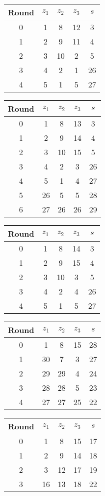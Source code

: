 \begin{multicols}{2}
\begin{tabular}{c | c | c | c | c }
Round & $z_1$ & $z_2$ & $z_3$ & $s$ \\
\hline
0 & 1 & 8 & 12 & 3 \\
1 & 2 & 9 & 11 & 4 \\
2 & 3 & 10 & 2 & 5 \\
3 & 4 & 2 & 1 & 26 \\
4 & 5 & 1 & 5 & 27
\end{tabular}


\begin{tabular}{c | c | c | c | c }
Round & $z_1$ & $z_2$ & $z_3$ & $s$ \\
\hline
0 & 1 & 8 & 13 & 3 \\
1 & 2 & 9 & 14 & 4 \\
2 & 3 & 10 & 15 & 5 \\
3 & 4 & 2 & 3 & 26 \\
4 & 5 & 1 & 4 & 27 \\
5 & 26 & 5 & 5 & 28 \\
6 & 27 & 26 & 26 & 29
\end{tabular}


\begin{tabular}{c | c | c | c | c }
Round & $z_1$ & $z_2$ & $z_3$ & $s$ \\
\hline
0 & 1 & 8 & 14 & 3 \\
1 & 2 & 9 & 15 & 4 \\
2 & 3 & 10 & 3 & 5 \\
3 & 4 & 2 & 4 & 26 \\
4 & 5 & 1 & 5 & 27
\end{tabular}


\begin{tabular}{c | c | c | c | c }
Round & $z_1$ & $z_2$ & $z_3$ & $s$ \\
\hline
0 & 1 & 8 & 15 & 28 \\
1 & 30 & 7 & 3 & 27 \\
2 & 29 & 29 & 4 & 24 \\
3 & 28 & 28 & 5 & 23 \\
4 & 27 & 27 & 25 & 22 \\
\end{tabular}

\begin{tabular}{c | c | c | c | c }
Round & $z_1$ & $z_2$ & $z_3$ & $s$ \\
\hline
0 & 1 & 8 & 15 & 17 \\
1 & 2 & 9 & 14 & 18 \\
2 & 3 & 12 & 17 & 19 \\
3 & 16 & 13 & 18 & 22
\end{tabular}


\end{multicols}
